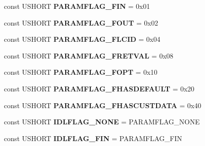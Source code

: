 \begin{DoxyCompactItemize}
const U\+S\+H\+O\+RT {\bfseries P\+A\+R\+A\+M\+F\+L\+A\+G\+\_\+\+F\+IN} = 0x01
\item 
\mbox{\label{interface_i_ole_automation_types_ad9920304d2bde1931706280bafa38708}} 
const U\+S\+H\+O\+RT {\bfseries P\+A\+R\+A\+M\+F\+L\+A\+G\+\_\+\+F\+O\+UT} = 0x02
\item 
\mbox{\label{interface_i_ole_automation_types_a1fedad8bc4f3cb063e07f5dbd4161ef5}} 
const U\+S\+H\+O\+RT {\bfseries P\+A\+R\+A\+M\+F\+L\+A\+G\+\_\+\+F\+L\+C\+ID} = 0x04
\item 
\mbox{\label{interface_i_ole_automation_types_a7b92abe229c05bedd12b2c1ab2fb8b7d}} 
const U\+S\+H\+O\+RT {\bfseries P\+A\+R\+A\+M\+F\+L\+A\+G\+\_\+\+F\+R\+E\+T\+V\+AL} = 0x08
\item 
\mbox{\label{interface_i_ole_automation_types_ad8cafdb043f67a2d36562466c2a54b7e}} 
const U\+S\+H\+O\+RT {\bfseries P\+A\+R\+A\+M\+F\+L\+A\+G\+\_\+\+F\+O\+PT} = 0x10
\item 
\mbox{\label{interface_i_ole_automation_types_aee3dbe7db6e639c09876b31b9accb588}} 
const U\+S\+H\+O\+RT {\bfseries P\+A\+R\+A\+M\+F\+L\+A\+G\+\_\+\+F\+H\+A\+S\+D\+E\+F\+A\+U\+LT} = 0x20
\item 
\mbox{\label{interface_i_ole_automation_types_ae551b0ee982c3ae62e827159dc4bae8d}} 
const U\+S\+H\+O\+RT {\bfseries P\+A\+R\+A\+M\+F\+L\+A\+G\+\_\+\+F\+H\+A\+S\+C\+U\+S\+T\+D\+A\+TA} = 0x40
\item 
\mbox{\label{interface_i_ole_automation_types_a88969d09c4e781b493327ebed8145fc2}} 
const U\+S\+H\+O\+RT {\bfseries I\+D\+L\+F\+L\+A\+G\+\_\+\+N\+O\+NE} = P\+A\+R\+A\+M\+F\+L\+A\+G\+\_\+\+N\+O\+NE
\item 
\mbox{\label{interface_i_ole_automation_types_a2ac6841555eeeb0ae51d5ba791e6f211}} 
const U\+S\+H\+O\+RT {\bfseries I\+D\+L\+F\+L\+A\+G\+\_\+\+F\+IN} = P\+A\+R\+A\+M\+F\+L\+A\+G\+\_\+\+F\+IN
\item 
\mbox{\label{interface_i_ole_automation_types_ab3f77e68c358241646ba308fe9c088e8}} 

\end{DoxyCompactItemize}
